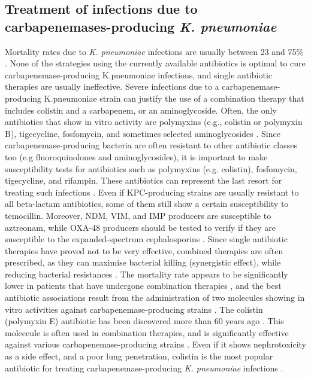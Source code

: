 \documentclass[11pt]{report}
\begin{document}
\subsection{Treatment of infections due to carbapenemases-producing \emph{K. pneumoniae}}
Mortality rates due to \emph{K. pneumoniae} infections are usually between 23 and 75$\%$ \cite{karaiskos2014multidrug}.
None of the strategies using the currently available antibiotics is optimal to cure carbapenemase-producing K.pneumoniae infections, and single antibiotic therapies are usually ineffective.
Severe infections due to a carbapenemase-producing K.pneumoniae strain can justify the use of a combination therapy that includes colistin and a carbapenem, or an aminoglycoside.
Often, the only antibiotics that show in vitro activity are polymyxins (e.g., colistin or polymyxin B), tigecycline, fosfomycin, and sometimes selected aminoglycosides \cite{rodriguez2015diagnosis}.
Since carbapenemase-producing bacteria are often resistant to other antibiotic classes too (e.g fluoroquinolones and aminoglycosides), it is important to make susceptibility tests for antibiotics such as polymyxins (e.g. colistin), fosfomycin, tigecycline, and rifampin.
These antibiotics can represent the last resort for treating such infections \cite{adams2009activity}.
Even if KPC-producing strains are usually resistant to all beta-lactam antibiotics, some of them still show a certain susceptibility to temocillin.
Moreover, NDM, VIM, and IMP producers are susceptible to aztreonam, while OXA-48 producers should be tested to verify if they are susceptible to the expanded-spectrum cephalosporins \cite{girlich2009ctx}.
Since single antibiotic therapies have proved not to be very effective, combined therapies are often prescribed, as they can maximise bacterial killing (synergistic effect), while reducing bacterial resistances \cite{Pitout2015}.
The mortality rate appears to be significantly lower in patients that have undergone combination therapies \cite{tzouvelekis2014treating, zavascki2013combination}, and the best antibiotic associations result from the administration of two molecules showing in vitro activities against carbapenemase-producing strains \cite{falagas2013antibiotic, tzouvelekis2014treating}.
The colistin (polymyxin E) antibiotic has been discovered more than 60 years ago \cite{karaiskos2014multidrug, rodriguez2015diagnosis}.
This moleceule is often used in combination therapies, and is significantly effective against various carbapenemase-producing strains \cite{falagas2013antibiotic, temkin2014carbapenem}.
Even if it shows nephrotoxicity as a side effect, and a poor lung penetration, colistin is the most popular antibiotic for treating carbapenemase-producing \emph{K. pneumoniae} infections \cite{karaiskos2014multidrug, rodriguez2015diagnosis}.
\end{document}
